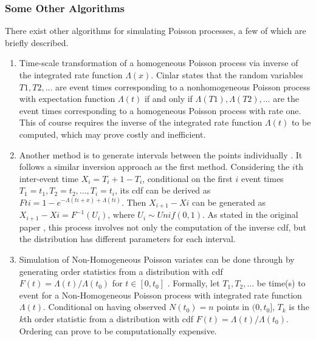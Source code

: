 \documentclass[%
 reprint,
 amsmath,amssymb,
 aps,
]{revtex4-2}
\theoremstyle{definition}
\begin{document}
\subsubsection{Some Other Algorithms}
There exist other algorithms for simulating Poisson processes, a few of which are briefly described.
\begin{enumerate}
\item Time-scale transformation of a homogeneous Poisson process via inverse of the integrated rate function $\Lambda(x)$. Cinlar \cite{cinlar1975introduction} states that the random variables $T1, T2, . . .$ are event times corresponding to a nonhomogeneous Poisson process with expectation function $\Lambda(t)$ if and only if $\Lambda(T1),\Lambda(T2), . . .$ are the event times corresponding to a homogeneous Poisson process with rate one. This of course requires the inverse of the integrated rate function $\Lambda(t)$ to be computed, which may prove costly and inefficient.

\item Another method is to generate intervals between the points individually \cite{pasupathy}. It follows a similar inversion approach as the first method. Considering the $i$th inter-event time $X_i = T_i+1 - T_i$, conditional on the first $i$ event times $T_1 = t_1, T_2 = t_2, . . . , T_i = t_i$, its cdf can be derived as $Fti = 1 - e^{-\Lambda(ti + x) + \Lambda(ti)}$. Then $X_{i+1} - X{i}$ can be generated as $X_{i+1} - X{i} = F^{-1}(U_i)$, where $U_i \sim Unif(0,1)$. As stated in the original paper \cite{lewis_shedler_1979}, this process involves not only the computation of the inverse cdf, but the distribution has different parameters for each interval.

\item Simulation of Non-Homogeneous Poisson variates can be done through by generating order statistics from a distribution with cdf $F(t) = \Lambda(t)/\Lambda(t_0)$ for $t\in [0,t_0]$ \cite{lewis_shedler_1976}. Formally, let $T_1 , T_2 , ...$ be time(s) to event for a Non-Homogeneous Poisson process with integrated rate function $\Lambda(t)$. Conditional on having observed $N(t_0) = n$ points in $(0,t_0]$, $T_k$ is the $k$th order statistic from a distribution with cdf $F(t) = \Lambda(t) / \Lambda(t_0)$. Ordering can prove to be computationally expensive.
\end{enumerate}
\end{document}
